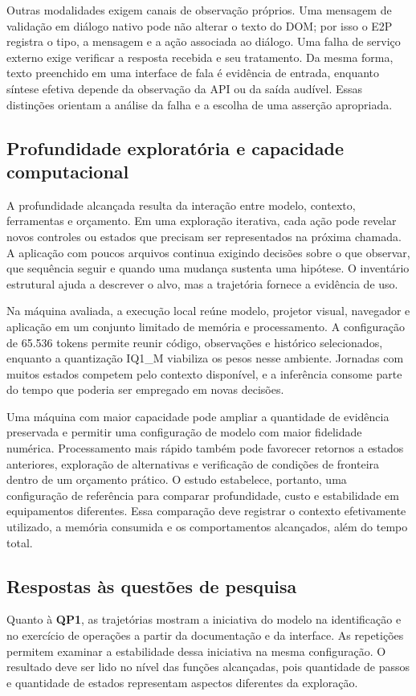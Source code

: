 \documentclass[12pt]{article}
\begin{document}
Outras modalidades exigem canais de observação próprios. Uma mensagem de validação em diálogo nativo pode não alterar o texto do DOM; por isso o E2P registra o tipo, a mensagem e a ação associada ao diálogo. Uma falha de serviço externo exige verificar a resposta recebida e seu tratamento. Da mesma forma, texto preenchido em uma interface de fala é evidência de entrada, enquanto síntese efetiva depende da observação da API ou da saída audível. Essas distinções orientam a análise da falha e a escolha de uma asserção apropriada.

\subsection{Profundidade exploratória e capacidade computacional}
A profundidade alcançada resulta da interação entre modelo, contexto, ferramentas e orçamento. Em uma exploração iterativa, cada ação pode revelar novos controles ou estados que precisam ser representados na próxima chamada. A aplicação com poucos arquivos continua exigindo decisões sobre o que observar, que sequência seguir e quando uma mudança sustenta uma hipótese. O inventário estrutural ajuda a descrever o alvo, mas a trajetória fornece a evidência de uso.

Na máquina avaliada, a execução local reúne modelo, projetor visual, navegador e aplicação em um conjunto limitado de memória e processamento. A configuração de 65.536 tokens permite reunir código, observações e histórico selecionados, enquanto a quantização IQ1\_M viabiliza os pesos nesse ambiente. Jornadas com muitos estados competem pelo contexto disponível, e a inferência consome parte do tempo que poderia ser empregado em novas decisões.

Uma máquina com maior capacidade pode ampliar a quantidade de evidência preservada e permitir uma configuração de modelo com maior fidelidade numérica. Processamento mais rápido também pode favorecer retornos a estados anteriores, exploração de alternativas e verificação de condições de fronteira dentro de um orçamento prático. O estudo estabelece, portanto, uma configuração de referência para comparar profundidade, custo e estabilidade em equipamentos diferentes. Essa comparação deve registrar o contexto efetivamente utilizado, a memória consumida e os comportamentos alcançados, além do tempo total.

\subsection{Respostas às questões de pesquisa}
Quanto à \textbf{QP1}, as trajetórias mostram a iniciativa do modelo na identificação e no exercício de operações a partir da documentação e da interface. As repetições permitem examinar a estabilidade dessa iniciativa na mesma configuração. O resultado deve ser lido no nível das funções alcançadas, pois quantidade de passos e quantidade de estados representam aspectos diferentes da exploração.
\end{document}
